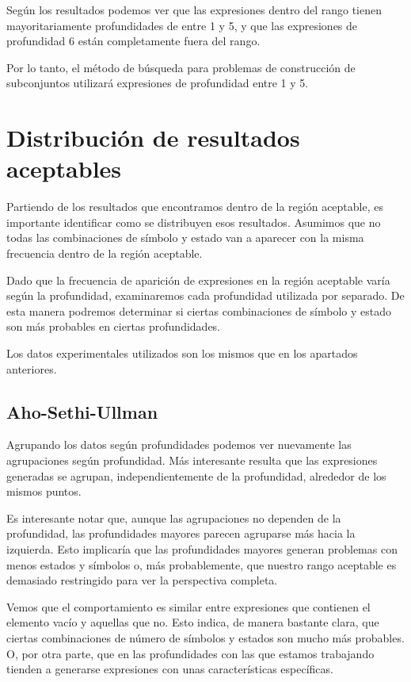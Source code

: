 Según los resultados podemos ver que las expresiones dentro del rango tienen mayoritariamente profundidades de entre 1 y 5, y que las expresiones de profundidad 6 están completamente fuera del rango.

Por lo tanto, el método de búsqueda para problemas de construcción de subconjuntos utilizará expresiones de profundidad entre 1 y 5.

\section{Distribución de resultados aceptables}

Partiendo de los resultados que encontramos dentro de la región aceptable, es importante identificar como se distribuyen esos resultados.
Asumimos que no todas las combinaciones de símbolo y estado van a aparecer con la misma frecuencia dentro de la región aceptable.

Dado que la frecuencia de aparición de expresiones en la región aceptable varía según la profundidad, examinaremos cada profundidad utilizada por separado.
De esta manera podremos determinar si ciertas combinaciones de símbolo y estado son más probables en ciertas profundidades.

Los datos experimentales utilizados son los mismos que en los apartados anteriores.

\subsection{Aho-Sethi-Ullman}

Agrupando los datos según profundidades podemos ver nuevamente las agrupaciones según profundidad.
Más interesante resulta que las expresiones generadas se agrupan, independientemente de la profundidad, alrededor de los mismos puntos.

Es interesante notar que, aunque las agrupaciones no dependen de la profundidad, las profundidades mayores parecen agruparse más hacia la izquierda.
Esto implicaría que las profundidades mayores generan problemas con menos estados y símbolos o, más probablemente, que nuestro rango aceptable es demasiado restringido para ver la perspectiva completa.


Vemos que el comportamiento es similar entre expresiones que contienen el elemento vacío y aquellas que no.
Esto indica, de manera bastante clara, que ciertas combinaciones de número de símbolos y estados son mucho más probables.
O, por otra parte, que en las profundidades con las que estamos trabajando tienden a generarse expresiones con unas características específicas.

